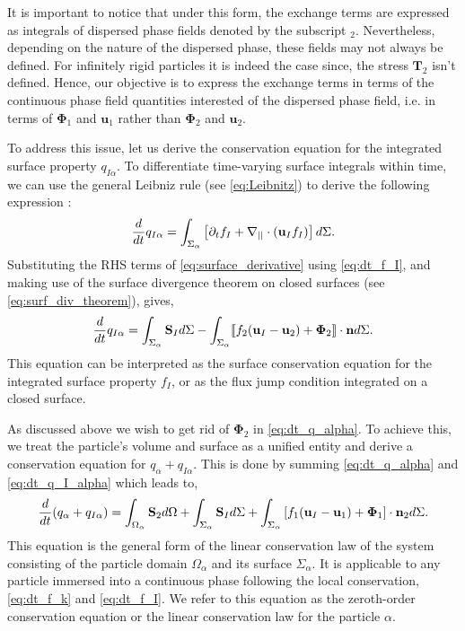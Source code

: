 It is important to notice that under this form, the exchange terms are expressed as integrals of dispersed phase fields denoted by the subscript $_2$.
Nevertheless, depending on the nature of the dispersed phase, these fields may not always be defined.
For infinitely rigid particles it is indeed the case since, the stress $\textbf{T}_2$ isn't defined.  
Hence, our objective is to express the exchange terms in terms of the continuous phase field quantities interested of the dispersed phase field, i.e. in terms of $\mathbf{\Phi}_1$ and $\textbf{u}_1$ rather than $\mathbf{\Phi}_2$ and $\textbf{u}_2$. 

To address this issue, let us derive the conservation equation for the integrated surface property $q_{I\alpha}$.
To differentiate time-varying surface integrals within time, we can use the general Leibniz rule (see \ref{eq:Leibnitz})\citep{bothe2022sharp,morel2015mathematical,stone1990simple} to derive the following expression :
\begin{equation}
    \frac{d}{d t}  q_{I\alpha}
    = \int_{\Sigma_\alpha} \left[
        \partial_t f_I
        +   \mathbf{\nabla}_{||} \cdot (\textbf{u}_If_I)
    \right]d\Sigma.
    \label{eq:surface_derivative}
\end{equation}
Substituting the RHS terms of \ref{eq:surface_derivative} using \ref{eq:dt_f_I}, and making use of the surface divergence theorem on closed surfaces (see \ref{eq:surf_div_theorem}), gives,
\begin{equation}
    \frac{d}{d t}  q_{I\alpha}
    = \int_{\Sigma_\alpha} 
        \textbf{S}_I
    d\Sigma
    - \int_{\Sigma_\alpha} \llbracket 
        f_2 (\textbf{u}_I - \textbf{u}_2)
        + \mathbf{\Phi}_2
     \rrbracket \cdot \textbf{n}
    d\Sigma.
    \label{eq:dt_q_I_alpha}
\end{equation}
This equation can be interpreted as the surface conservation equation for the integrated surface property $f_I$, or as the flux jump condition integrated on a closed surface. 

As discussed above we wish to get rid of $\mathbf{\Phi}_2$ in \ref{eq:dt_q_alpha}. To achieve this, we treat the particle's volume and surface as a unified entity and derive a conservation equation for $q_\alpha + q_{I\alpha}$. 
This is done by summing \ref{eq:dt_q_alpha} and \ref{eq:dt_q_I_alpha} which leads to, 
\begin{equation}
    \frac{d}{d t}  (q_\alpha+q_{I\alpha})
    = 
    \int_{\Omega_\alpha} \textbf{S}_2 d\Omega
    + \int_{\Sigma_\alpha} \textbf{S}_I d\Sigma
    + \int_{\Sigma_\alpha} \left[
        f_1 (\textbf{u}_I-\textbf{u}_1) 
        + \mathbf{\Phi}_1 
        \right] \cdot \textbf{n}_2 d\Sigma. 
    \label{eq:dt_q_alpha_tot}
\end{equation}
This equation is the general form of the linear conservation law of the system consisting of the particle domain $\Omega_\alpha$ and its surface $\Sigma_\alpha$. It is applicable to any particle immersed into a continuous phase following the local conservation,\ref{eq:dt_f_k} and \ref{eq:dt_f_I}.
We refer to this equation as the zeroth-order conservation equation or the linear conservation law for the particle $\alpha$.

